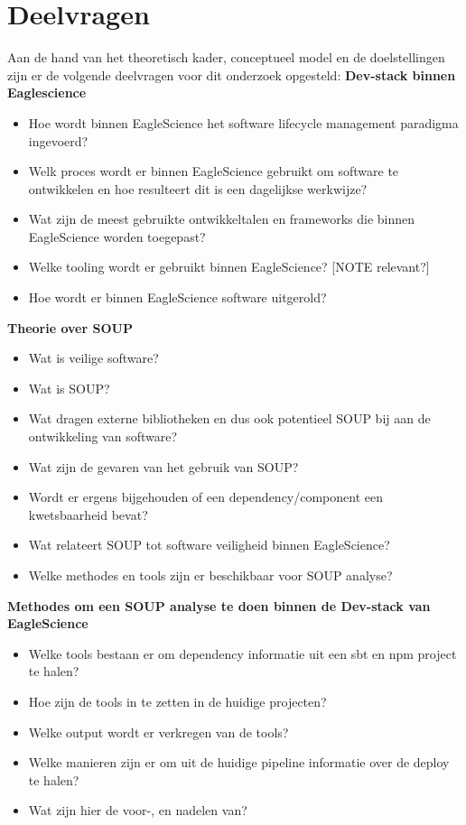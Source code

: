 \section{Deelvragen}\label{sec:deelvragen}
Aan de hand van het theoretisch kader, conceptueel model en de doelstellingen zijn er de volgende deelvragen voor dit onderzoek opgesteld:
\textbf{Dev-stack binnen Eaglescience}
\begin{itemize}
    \item Hoe wordt binnen EagleScience het software lifecycle management paradigma ingevoerd?
    \item Welk proces wordt er binnen EagleScience gebruikt om software te ontwikkelen en hoe resulteert dit is een dagelijkse werkwijze?
    \item Wat zijn de meest gebruikte ontwikkeltalen en frameworks die binnen EagleScience worden toegepast?
    \item Welke tooling wordt er gebruikt binnen EagleScience? [NOTE relevant?]
    \item Hoe wordt er binnen EagleScience software uitgerold?
\end{itemize}
\textbf{Theorie over SOUP}
\begin{itemize}
    \item Wat is veilige software?
    \item Wat is SOUP?
    \item Wat dragen externe bibliotheken en dus ook potentieel SOUP bij aan de ontwikkeling van software?
    \item Wat zijn de gevaren van het gebruik van SOUP?
    \item Wordt er ergens bijgehouden of een dependency/component een kwetsbaarheid bevat?
    \item Wat relateert SOUP tot software veiligheid binnen EagleScience?
    \item Welke methodes en tools zijn er beschikbaar voor SOUP analyse?
\end{itemize}
\textbf{Methodes om een SOUP analyse te doen binnen de Dev-stack van EagleScience}
\begin{itemize}
    \item Welke tools bestaan er om dependency informatie uit een sbt en npm project te halen?
    \item Hoe zijn de tools in te zetten in de huidige projecten?
    \item Welke output wordt er verkregen van de tools?
    \item Welke manieren zijn er om uit de huidige pipeline informatie over de deploy te halen?
    \item Wat zijn hier de voor-, en nadelen van?
\end{itemize}


